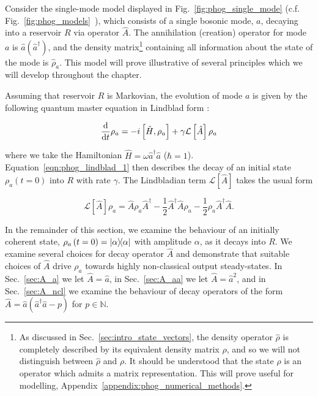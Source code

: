 Consider the single-mode model displayed in Fig.~\ref{fig:phog_single_mode} (c.f. Fig.~\ref{fig:phog_models}~), which consists of a single bosonic mode, $a$, decaying into a reservoir $R$ via operator $\hat{A}$. The annihilation (creation) operator for mode $a$ is $\hat{a} \left(\hat{a}^\dagger\right)$, and the density matrix\footnote{As discussed in Sec.~\ref{sec:intro_state_vectors}, the density operator $\hat{\rho}$ is completely described by its equivalent density matrix $\rho$, and so we will not distinguish between $\hat{\rho}$ and $\rho$. It should be understood that the state $\rho$ is an operator which admits a matrix representation. This will prove useful for modelling, Appendix~\ref{appendix:phog_numerical_methods}.} containing all information about the state of the mode is $\hat{\rho}_a$. This model will prove illustrative of several principles which we will develop throughout the chapter. 

Assuming that reservoir $R$ is Markovian, the evolution of mode $a$ is given by the following quantum master equation in Lindblad form \cite{Carmichael1999a, Breuer2002}:


\begin{equation}\label{eqn:phog_lindblad_1}
\frac{\mathrm{d}}{\mathrm{d}t} \rho_a =  - i \left[\hat{H}, \rho_a\right] + \gamma \mathcal{L}\left[\hat{A}\right]\rho_a
\end{equation}

\noindent where we take the Hamiltonian $\hat{H} =  \omega \hat{a}^\dagger \hat{a}$ ($\hbar = 1$). Equation~\ref{eqn:phog_lindblad_1} then describes the decay of an initial state $\rho_a\left(t=0\right)$ into $R$ with rate $\gamma$. The Lindbladian term $\mathcal{L}\left[\hat{A}\right]$ takes the usual form 

\begin{equation}\label{eqn:phog_lindbladian_form}
\mathcal{L}\left[\hat{A}\right]\rho_a = \hat{A}\rho_a\hat{A}^\dagger - \frac{1}{2} \hat{A}^\dagger \hat{A} \rho_a - \frac{1}{2} \rho_a \hat{A}^\dagger \hat{A}.
\end{equation}

\noindent In the remainder of this section, we examine the behaviour of an initially coherent state, $\rho_a\left(t=0\right) = \dyad{\alpha}$ with amplitude $\alpha$, as it decays into $R$. We examine several choices for decay operator $\hat{A}$ and demonstrate that suitable choices of $\hat{A}$ drive $\rho_a$ towards highly non-classical output steady-states. In Sec.~\ref{sec:A_a} we let $\hat{A} = \hat{a}$, in Sec.~\ref{sec:A_aa} we let $\hat{A} = \hat{a}^2$, and in Sec.~\ref{sec:A_ncl} we examine the behaviour of decay operators of the form $\hat{A} = \hat{a} \left(\hat{a}^\dagger \hat{a} - p\right)$ for $p \in \mathbb{N}$.



